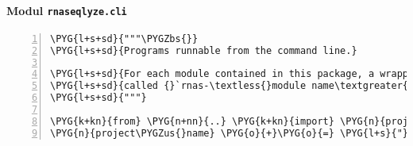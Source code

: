 \paragraph{Modul \texttt{rnaseqlyze.cli}}
\label{rnaseqlyze-pdf:modul-rnaseqlyze-cli}
\begin{Verbatim}[commandchars=\\\{\},numbers=left,firstnumber=1,stepnumber=5]
\PYG{l+s+sd}{"""\PYGZbs{}}
\PYG{l+s+sd}{Programs runnable from the command line.}

\PYG{l+s+sd}{For each module contained in this package, a wrapper script}
\PYG{l+s+sd}{called {}`rnas-\textless{}module name\textgreater{}{}` will be installed in {}`\textless{}prefix\textgreater{}/bin{}`.}
\PYG{l+s+sd}{"""}

\PYG{k+kn}{from} \PYG{n+nn}{..} \PYG{k+kn}{import} \PYG{n}{project\PYGZus{}name}
\PYG{n}{project\PYGZus{}name} \PYG{o}{+}\PYG{o}{=} \PYG{l+s}{"}\PYG{l+s}{-cli}\PYG{l+s}{"}
\end{Verbatim}


